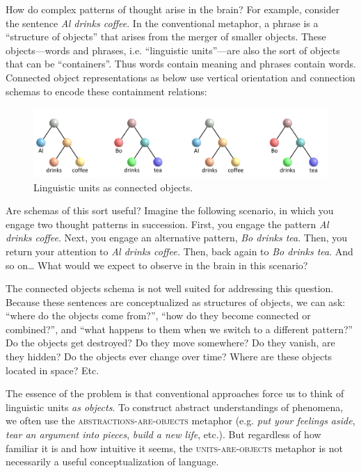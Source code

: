 How do complex patterns of thought arise in the brain? For example, consider the sentence \textit{Al drinks coffee}. In the conventional metaphor, a phrase is a “structure of objects” that arises from the merger of smaller objects. These objects—words and phrases, i.e. “linguistic units”—are also the sort of objects that can be “containers”. Thus words contain meaning and phrases contain words. Connected object representations as below use vertical orientation and connection schemas to encode these containment relations:

  
\begin{figure}
\includegraphics[width=\textwidth]{figures/Tilsen-img8.png}
\caption{Linguistic units as connected objects.}
\label{fig:2:1}
\end{figure}
 

  Are schemas of this sort useful? Imagine the following scenario, in which you engage two thought patterns in succession. First, you engage the pattern \textit{Al drinks coffee}. Next, you engage an alternative pattern, \textit{Bo drinks tea}. Then, you return your attention to \textit{Al drinks coffee.} Then, back again to \textit{Bo drinks tea}. And so on… What would we expect to observe in the brain in this scenario? 

  The connected objects schema is not well suited for addressing this question. Because these sentences are conceptualized as structures of objects, we can ask: “where do the objects come from?”, “how do they become connected or combined?”, and “what happens to them when we switch to a different pattern?” Do the objects get destroyed? Do they move somewhere? Do they vanish, are they hidden? Do the objects ever change over time? Where are these objects located in space? Etc.

  The essence of the problem is that conventional approaches force us to think of linguistic units \textit{as objects}. To construct abstract understandings of phenomena, we often use the \textsc{abstractions-}\textsc{are}\textsc{{}-objects} metaphor (e.g. \textit{put your feelings aside}, \textit{tear an argument into pieces}, \textit{build a new life}, etc.). But regardless of how familiar it is and how intuitive it seems, the \textsc{units}\textsc{{}-are-}\textsc{objects} metaphor is not necessarily a useful conceptualization of language. 

